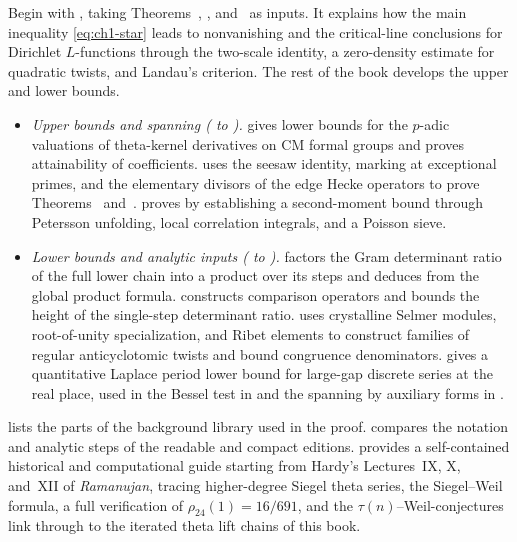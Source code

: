 Begin with , taking Theorems~, , and~ as inputs. It explains how the main inequality \eqref{eq:ch1-star} leads to nonvanishing and the critical-line conclusions for Dirichlet $L$-functions through the two-scale identity, a zero-density estimate for quadratic twists, and Landau's criterion. The rest of the book develops the upper and lower bounds.
\begin{itemize}
\item \emph{Upper bounds and spanning ( to ).}  gives lower bounds for the $p$-adic valuations of theta-kernel derivatives on CM formal groups and proves attainability of coefficients.  uses the seesaw identity, marking at exceptional primes, and the elementary divisors of the edge Hecke operators to prove Theorems~ and~.  proves  by establishing a second-moment bound through Petersson unfolding, local correlation integrals, and a Poisson sieve.
\item \emph{Lower bounds and analytic inputs ( to ).}  factors the Gram determinant ratio of the full lower chain into a product over its steps and deduces  from the global product formula.  constructs comparison operators and bounds the height of the single-step determinant ratio.  uses crystalline Selmer modules, root-of-unity specialization, and Ribet elements to construct families of regular anticyclotomic twists and bound congruence denominators.  gives a quantitative Laplace period lower bound for large-gap discrete series at the real place, used in the Bessel test in  and the spanning by auxiliary forms in .
\end{itemize}
 lists the parts of the background library used in the proof.  compares the notation and analytic steps of the readable and compact editions.  provides a self-contained historical and computational guide starting from Hardy's Lectures~IX, X, and~XII of \emph{Ramanujan}, tracing higher-degree Siegel theta series, the Siegel--Weil formula, a full verification of $\rho_{24}(1)=16/691$, and the $\tau(n)$--Weil-conjectures link through to the iterated theta lift chains of this book.

